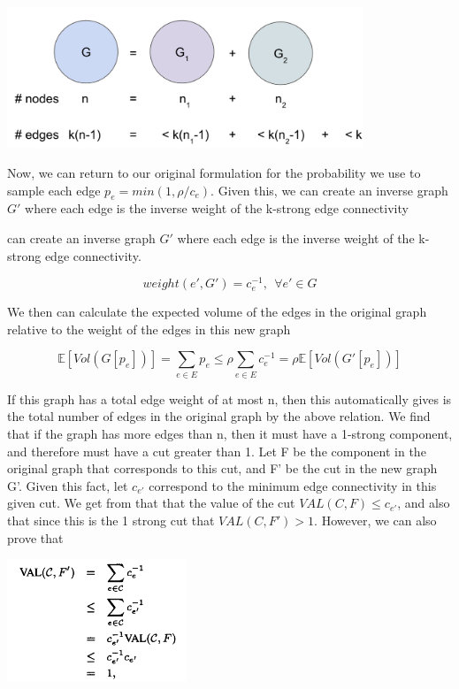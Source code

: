 \documentclass[11pt]{article}
\begin{document}
\begin{center}
\includegraphics[width=0.8\textwidth]{figures/k_strong_lemma.png}
\end{center}

Now, we can return to our original formulation for the probability we use to sample each edge $p_e = min(1, \rho/c_e)$. Given this, we can create an inverse graph $G'$ where each edge is the inverse weight of the k-strong edge connectivity

can create an inverse graph $G'$ where each edge is the inverse weight of the k-strong edge connectivity.

\begin{equation}
    weight(e', G') = c_{e}^{-1}, \ \  \forall e' \in G
\end{equation}
 
We then can calculate the expected volume of the edges in the original graph relative to the weight of the edges in this new graph 

\begin{equation}
    \mathbb{E}[Vol(G[p_e])] = \sum_{e \in E} p_e \leq \rho \sum_{e \in E} c_e^{-1} = \rho \mathbb{E}[Vol(G'[p_e])]
\end{equation}

If this graph has a total edge weight of at most n, then this automatically gives is the total number of edges in the original graph by the above relation. We find that if the graph has more edges than n, then it must have a 1-strong component, and therefore must have a cut greater than 1. Let F be the component in the original graph that corresponds to this cut, and F' be the cut in the new graph G'. Given this fact, let $c_{e'}$ correspond to the minimum edge connectivity in this given cut.  We get from that that the value of the cut $VAL(C,F) \leq c_{e'}$, and also that since this is the 1 strong cut that $VAL(C,F') > 1$. However, we can also prove that 

\begin{center}
\includegraphics[width=0.4\textwidth]{figures/num_edges_proof.png}
\end{center}
\end{document}
